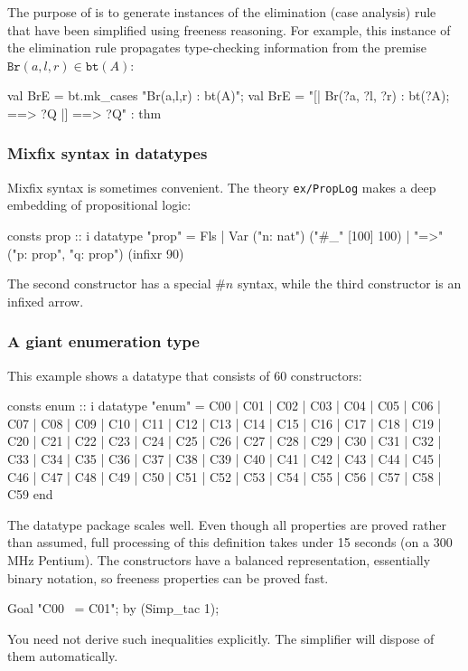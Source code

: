 The purpose of  is to generate instances of the elimination
(case analysis) rule that have been simplified using freeness reasoning.  For
example, this instance of the elimination rule propagates type-checking
information from the premise $\texttt{Br}(a,l,r)\in\texttt{bt}(A)$:
\begin{ttbox}
val BrE = bt.mk_cases "Br(a,l,r) : bt(A)";
{\out val BrE =}
{\out   "[| Br(?a, ?l, ?r) : bt(?A);}
{\out       [| ?a : ?A; ?l : bt(?A); ?r : bt(?A) |] ==> ?Q |] ==> ?Q" : thm}
\end{ttbox}


\subsubsection{Mixfix syntax in datatypes}

Mixfix syntax is sometimes convenient.  The theory \texttt{ex/PropLog} makes a
deep embedding of propositional logic:
\begin{ttbox}
consts     prop :: i
datatype  "prop" = Fls
                 | Var ("n: nat")                ("#_" [100] 100)
                 | "=>" ("p: prop", "q: prop")   (infixr 90)
\end{ttbox}
The second constructor has a special $\#n$ syntax, while the third constructor
is an infixed arrow.


\subsubsection{A giant enumeration type}

This example shows a datatype that consists of 60 constructors:
\begin{ttbox}
consts  enum :: i
datatype
  "enum" = C00 | C01 | C02 | C03 | C04 | C05 | C06 | C07 | C08 | C09
         | C10 | C11 | C12 | C13 | C14 | C15 | C16 | C17 | C18 | C19
         | C20 | C21 | C22 | C23 | C24 | C25 | C26 | C27 | C28 | C29
         | C30 | C31 | C32 | C33 | C34 | C35 | C36 | C37 | C38 | C39
         | C40 | C41 | C42 | C43 | C44 | C45 | C46 | C47 | C48 | C49
         | C50 | C51 | C52 | C53 | C54 | C55 | C56 | C57 | C58 | C59
end
\end{ttbox}
The datatype package scales well.  Even though all properties are proved
rather than assumed, full processing of this definition takes under 15 seconds
(on a 300 MHz Pentium).  The constructors have a balanced representation,
essentially binary notation, so freeness properties can be proved fast.
\begin{ttbox}
Goal "C00 ~= C01";
by (Simp_tac 1);
\end{ttbox}
You need not derive such inequalities explicitly.  The simplifier will dispose
of them automatically.

